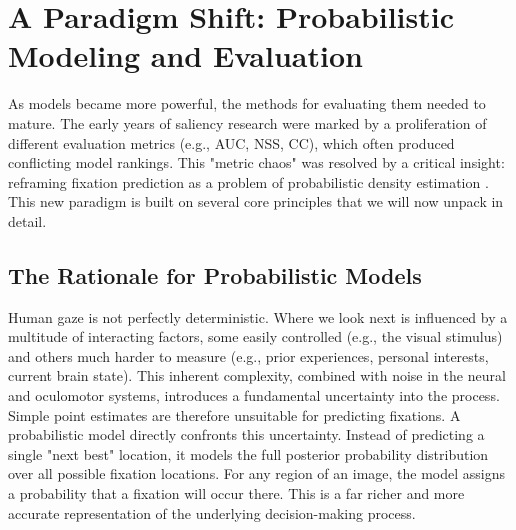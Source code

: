 \section[Probabilistic Modeling and Evaluation]{A Paradigm Shift: Probabilistic Modeling and Evaluation}
As models became more powerful, the methods for evaluating them needed to mature. The early years of saliency research were marked by a proliferation of different evaluation metrics (e.g., AUC, NSS, CC), which often produced conflicting model rankings. This "metric chaos" was resolved by a critical insight: reframing fixation prediction as a problem of probabilistic density estimation \cite{kummerer2023predicting}.
This new paradigm is built on several core principles that we will now unpack in detail.


\subsection{The Rationale for Probabilistic Models}
Human gaze is not perfectly deterministic. Where we look next is influenced by a multitude of interacting factors, some easily controlled (e.g., the visual stimulus) and others much harder to measure (e.g., prior experiences, personal interests, current brain state). This inherent complexity, combined with noise in the neural and oculomotor systems, introduces a fundamental uncertainty into the process. Simple point estimates are therefore unsuitable for predicting fixations.
A probabilistic model directly confronts this uncertainty. Instead of predicting a single "next best" location, it models the full posterior probability distribution over all possible fixation locations. For any region of an image, the model assigns a probability that a fixation will occur there. This is a far richer and more accurate representation of the underlying decision-making process.
